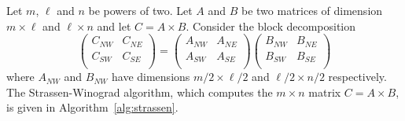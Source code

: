 Let $m$, $\ell$ and $n$ be powers of two. Let $A$ and $B$ be two matrices of dimension $m \times \ell$ and $\ell \times n$ and let $C = A \times B$. Consider the block decomposition
\[
 \left(\begin{array}{cc}
           C_{NW} & C_{NE}\\
           C_{SW} & C_{SE}\\
           \end{array}\right)
  = \left(\begin{array}{cc}
           A_{NW} & A_{NE}\\
           A_{SW} & A_{SE}\\
           \end{array}\right)
  \left(\begin{array}{cc}
           B_{NW} & B_{NE}\\
           B_{SW} & B_{SE}\\
           \end{array}\right)
\]
where $A_{NW}$ and $B_{NW}$ have dimensions $m/2 \times \ell/2$ and $\ell/2 \times n/2$ respectively. The Strassen-Winograd algorithm, which computes the $m \times n$ matrix $C = A \times B$, is given in Algorithm~\ref{alg:strassen}.



